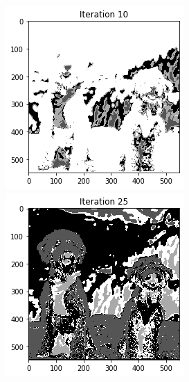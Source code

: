 \documentclass[11pt]{article}
\begin{document}
\begin{figure}[!htb]
\begin{center}
\begin{multicols}{5}
    \includegraphics[height = \linewidth]{dogs_10}\par
	\includegraphics[height = \linewidth]{dogs_25}\par

\end{multicols}
\end{center}
\end{figure}
\end{document}
